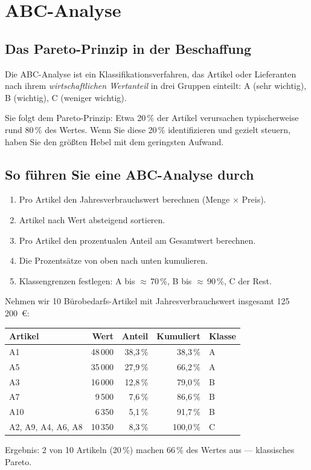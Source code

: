 \documentclass[11pt, a4paper]{article}
\begin{document}
\section{ABC-Analyse}

\subsection{Das Pareto-Prinzip in der Beschaffung}

\begin{merksatz}
Die ABC-Analyse ist ein Klassifikationsverfahren, das Artikel oder Lieferanten nach
ihrem \emph{wirtschaftlichen Wertanteil} in drei Gruppen einteilt: A (sehr wichtig),
B (wichtig), C (weniger wichtig).
\end{merksatz}

Sie folgt dem Pareto-Prinzip: Etwa 20\,\% der Artikel verursachen typischerweise rund
80\,\% des Wertes. Wenn Sie diese 20\,\% identifizieren und gezielt steuern, haben Sie
den größten Hebel mit dem geringsten Aufwand.

\subsection{So führen Sie eine ABC-Analyse durch}

\begin{enumerate}
  \item Pro Artikel den Jahresverbrauchswert berechnen (Menge $\times$ Preis).
  \item Artikel nach Wert absteigend sortieren.
  \item Pro Artikel den prozentualen Anteil am Gesamtwert berechnen.
  \item Die Prozentsätze von oben nach unten kumulieren.
  \item Klassengrenzen festlegen: A bis $\approx$\,70\,\%, B bis $\approx$\,90\,\%, C der Rest.
\end{enumerate}

\begin{beispiel}
Nehmen wir 10 Bürobedarfs-Artikel mit Jahres\-verbrauchswert insgesamt 125\,200~€:

\begin{center}
\begin{tabular}{lrrrl}
\toprule
\textbf{Artikel} & \textbf{Wert} & \textbf{Anteil} & \textbf{Kumuliert} & \textbf{Klasse}\\
\midrule
A1 & 48\,000 & 38{,}3\,\% & 38{,}3\,\% & A\\
A5 & 35\,000 & 27{,}9\,\% & 66{,}2\,\% & A\\
A3 & 16\,000 & 12{,}8\,\% & 79{,}0\,\% & B\\
A7 & 9\,500 & 7{,}6\,\% & 86{,}6\,\% & B\\
A10 & 6\,350 & 5{,}1\,\% & 91{,}7\,\% & B\\
A2, A9, A4, A6, A8 & 10\,350 & 8{,}3\,\% & 100{,}0\,\% & C\\
\bottomrule
\end{tabular}
\end{center}

Ergebnis: 2 von 10 Artikeln (20\,\%) machen 66\,\% des Wertes aus --- klassisches Pareto.
\end{beispiel}
\end{document}
